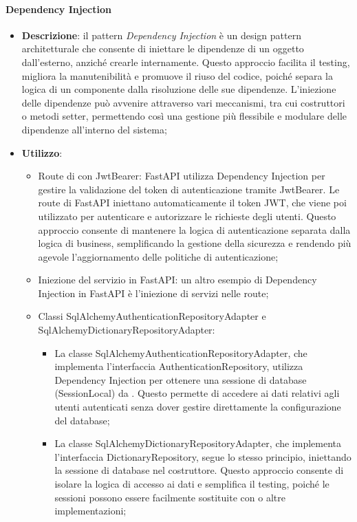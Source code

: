 \paragraph{Dependency Injection}
\begin{itemize}
    \item \textbf{Descrizione}: il pattern \textit{Dependency Injection} è un design pattern architetturale che consente di iniettare le dipendenze di un oggetto dall'esterno, anziché crearle internamente. Questo approccio facilita il testing, migliora la manutenibilità e promuove il riuso del codice, poiché separa la logica di un componente dalla risoluzione delle sue dipendenze. L'iniezione delle dipendenze può avvenire attraverso vari meccanismi, tra cui costruttori o metodi setter, permettendo così una gestione più flessibile e modulare delle dipendenze all'interno del sistema;
    \item \textbf{Utilizzo}:
    \begin{itemize}
        \item Route di  con JwtBearer: FastAPI utilizza Dependency Injection per gestire la validazione del token di autenticazione tramite JwtBearer. Le route di FastAPI iniettano automaticamente il token JWT, che viene poi utilizzato per autenticare e autorizzare le richieste degli utenti. Questo approccio consente di mantenere la logica di autenticazione separata dalla logica di business, semplificando la gestione della sicurezza e rendendo più agevole l'aggiornamento delle politiche di autenticazione;
        \item Iniezione del servizio in FastAPI: un altro esempio di Dependency Injection in FastAPI è l'iniezione di servizi nelle route;
        \item Classi SqlAlchemyAuthenticationRepositoryAdapter e SqlAlchemyDictionaryRepositoryAdapter:
        \begin{itemize}
            \item La classe SqlAlchemyAuthenticationRepositoryAdapter, che implementa l'interfaccia AuthenticationRepository, utilizza Dependency Injection per ottenere una sessione di database (SessionLocal) da . Questo permette di accedere ai dati relativi agli utenti autenticati senza dover gestire direttamente la configurazione del database;
            \item La classe SqlAlchemyDictionaryRepositoryAdapter, che implementa l'interfaccia DictionaryRepository, segue lo stesso principio, iniettando la sessione di database nel costruttore. Questo approccio consente di isolare la logica di accesso ai dati e semplifica il testing, poiché le sessioni possono essere facilmente sostituite con  o altre implementazioni;

\end{itemize}
\end{itemize}
\end{itemize}
